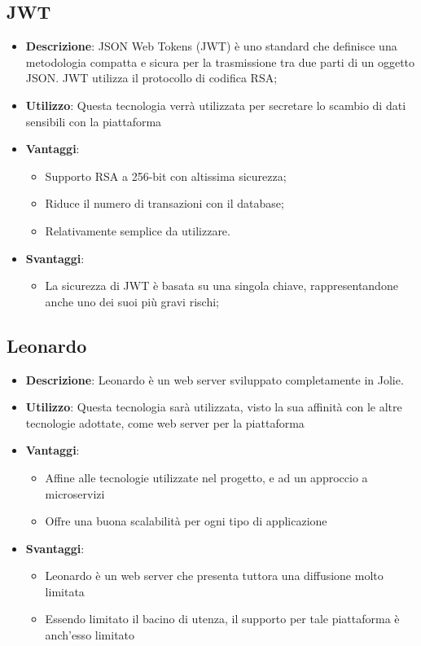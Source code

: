 \subsection{JWT}
\begin{itemize}
	\item \textbf{Descrizione}: JSON Web Tokens (JWT) è uno standard che definisce una metodologia compatta e sicura per la trasmissione tra due parti di un oggetto JSON. JWT utilizza il protocollo di codifica RSA;
	\item \textbf{Utilizzo}: Questa tecnologia verrà utilizzata per secretare lo scambio di dati sensibili con la piattaforma
	\item \textbf{Vantaggi}:
	\begin{itemize}
		\item Supporto RSA a 256-bit con altissima sicurezza;
		\item Riduce il numero di transazioni con il database;
		\item Relativamente semplice da utilizzare.
	\end{itemize}
	\item \textbf{Svantaggi}:
	\begin{itemize}
		\item La sicurezza di JWT è basata su una singola chiave, rappresentandone anche uno dei suoi più gravi rischi;
	\end{itemize}
\end{itemize}

\subsection{Leonardo}
\begin{itemize}
	\item \textbf{Descrizione}: Leonardo è un web server sviluppato completamente in Jolie. 
	\item \textbf{Utilizzo}: Questa tecnologia sarà utilizzata, visto la sua affinità con le altre tecnologie adottate, come web server per la piattaforma
	\item \textbf{Vantaggi}:
	\begin{itemize}
		\item Affine alle tecnologie utilizzate nel progetto, e ad un approccio a microservizi
		\item Offre una buona scalabilità per ogni tipo di applicazione
	\end{itemize}
	\item \textbf{Svantaggi}:
	\begin{itemize}
		\item Leonardo è un web server che presenta tuttora una diffusione molto limitata
		\item Essendo limitato il bacino di utenza, il supporto per tale piattaforma è anch'esso limitato
	\end{itemize}
\end{itemize}

